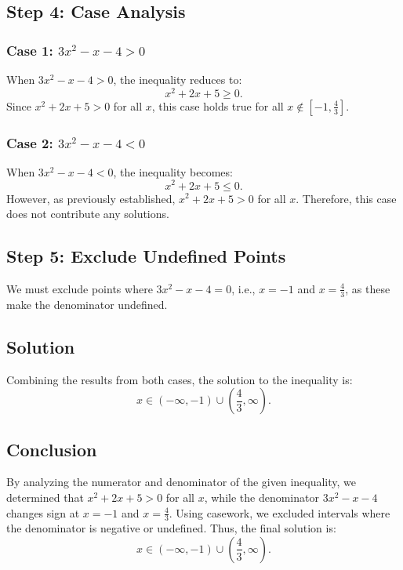 \documentclass{article}
\begin{document}
\subsection*{Step 4: Case Analysis}
\subsubsection*{Case 1: \( 3x^2 - x - 4 > 0 \)}
When \( 3x^2 - x - 4 > 0 \), the inequality reduces to:
\[
x^2 + 2x + 5 \geq 0.
\]
Since \( x^2 + 2x + 5 > 0 \) for all \( x \), this case holds true for all \( x \notin [-1, \frac{4}{3}] \).

\subsubsection*{Case 2: \( 3x^2 - x - 4 < 0 \)}
When \( 3x^2 - x - 4 < 0 \), the inequality becomes:
\[
x^2 + 2x + 5 \leq 0.
\]
However, as previously established, \( x^2 + 2x + 5 > 0 \) for all \( x \). Therefore, this case does not contribute any solutions.

\subsection*{Step 5: Exclude Undefined Points}
We must exclude points where \( 3x^2 - x - 4 = 0 \), i.e., \( x = -1 \) and \( x = \frac{4}{3} \), as these make the denominator undefined.

\subsection*{Solution}
Combining the results from both cases, the solution to the inequality is:
\[
x \in (-\infty, -1) \cup \left(\frac{4}{3}, \infty\right).
\]

\subsection*{Conclusion}
By analyzing the numerator and denominator of the given inequality, we determined that \( x^2 + 2x + 5 > 0 \) for all \( x \), while the denominator \( 3x^2 - x - 4 \) changes sign at \( x = -1 \) and \( x = \frac{4}{3} \). Using casework, we excluded intervals where the denominator is negative or undefined. Thus, the final solution is:
\[
x \in (-\infty, -1) \cup \left(\frac{4}{3}, \infty\right).
\]
\end{document}
